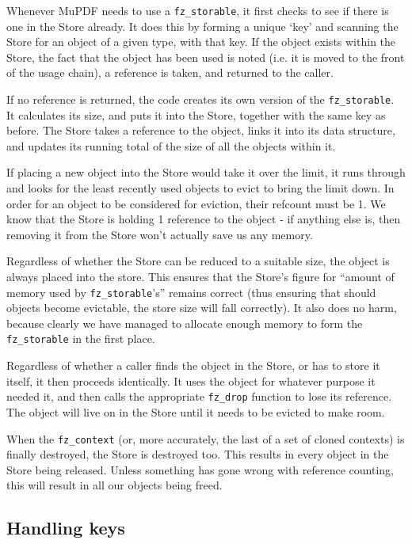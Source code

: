 \documentclass[oneside]{book}
\begin{document}
Whenever MuPDF needs to use a \texttt{fz\_storable}, it first checks to see if there is one in the Store already. It does this by forming a unique `key' and scanning the Store for an object of a given type, with that key. If the object exists within the Store, the fact that the object has been used is noted (i.e. it is moved to the front of the usage chain), a reference is taken, and returned to the caller.

If no reference is returned, the code creates its own version of the \texttt{fz\_storable}. It calculates its size, and puts it into the Store, together with the same key as before. The Store takes a reference to the object, links it into its data structure, and updates its running total of the size of all the objects within it.

If placing a new object into the Store would take it over the limit, it runs through and looks for the least recently used objects to evict to bring the limit down. In order for an object to be considered for eviction, their refcount must be 1. We know that the Store is holding 1 reference to the object - if anything else is, then removing it from the Store won't actually save us any memory.

Regardless of whether the Store can be reduced to a suitable size, the object is always placed into the store. This ensures that the Store's figure for ``amount of memory used by \texttt{fz\_storable}'s'' remains correct (thus ensuring that should objects become evictable, the store size will fall correctly). It also does no harm, because clearly we have managed to allocate enough memory to form the \texttt{fz\_storable} in the first place.

Regardless of whether a caller finds the object in the Store, or has to store it itself, it then proceeds identically. It uses the object for whatever purpose it needed it, and then calls the appropriate \texttt{fz\_drop} function to lose its reference. The object will live on in the Store until it needs to be evicted to make room.

When the \texttt{fz\_context} (or, more accurately, the last of a set of cloned contexts) is finally destroyed, the Store is destroyed too. This results in every object in the Store being released. Unless something has gone wrong with reference counting, this will result in all our objects being freed. 

\subsection{Handling keys}
\end{document}
